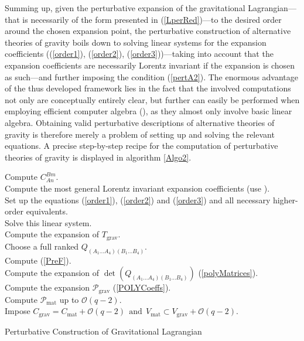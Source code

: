 \documentclass[%
preprint,
titlepage,
nofootinbib,
amsmath,amssymb,
showkeys,
aps,
prd,
floatfix,
]{revtex4-2}
\begin{document}
Summing up, given the perturbative expansion of the gravitational Lagrangian---that is necessarily of the form presented in (\ref{LperRed})---to the desired order around the chosen expansion point, the perturbative construction of alternative theories of gravity boils down to solving linear systems for the expansion coefficients ((\ref{order1}), (\ref{order2}), (\ref{order3}))---taking into account that the expansion coefficients are necessarily Lorentz invariant if the expansion is chosen as such---and further imposing the condition
(\ref{pertA2}). The enormous advantage of the thus developed framework lies in the fact that the involved computations not only are conceptually entirely clear, but further can easily be performed when employing efficient computer algebra (\cite{sparse-tensor}), as they almost only involve basic linear algebra. Obtaining valid perturbative descriptions of alternative theories of gravity is therefore merely a problem of setting up and solving the relevant equations. A precise step-by-step recipe for the computation of perturbative theories of gravity is displayed in algorithm \ref{Algo2}.
\begin{algorithm}[hbt!]
\SetAlgoLined
{}
Compute $C^{Bm}_{An}$. \\
Compute the most general Lorentz invariant expansion coefficients (use \cite{sparse-tensor}).\\
Set up the equations (\ref{order1}), (\ref{order2}) and (\ref{order3}) and all necessary higher-order equivalents.\\
Solve this linear system. \\
Compute the expansion of $T_{\text{grav}}$.\\
Choose a full ranked $Q_{(A_1...A_4)(B_1...B_4)}$. \\
Compute (\ref{PreF}).\\
Compute the expansion of $\operatorname{det}(Q_{(A_1...A_4)(B_1...B_4)})$ (\ref{polyMatrices}). \\
Compute the expansion $\mathcal{P}_{\text{grav}}$ (\ref{POLYCoeffs}). \\
Compute $\mathcal{P}_{\text{mat}}$ up to $\mathcal{O}(q-2)$.\\
Impose $C_{\text{grav}} = C_{\text{mat}} + \mathcal{O}(q-2) \ \ \text{and} \ \ V_{\text{mat}} \subset V_{\text{grav}} + \mathcal{O}(q-2)$.
 \caption{Perturbative Construction of Gravitational Lagrangian}\label{Algo2}
\end{algorithm}
\end{document}
